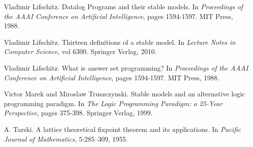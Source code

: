 \documentclass[11pt]{article}
\begin{document}
\begin{thebibliography}{16}
  Vladimir Lifschitz. 
  Datalog Programs and their stable models.
  In \textit{Proceedings of the AAAI Conference on Artificial Intelligence}, pages 1594-1597. 
  MIT Press, 1988.

  Vladimir Lifschitz. 
  Thirteen definitions of a stable model.  
  In \textit{Lecture Notes in Computer Science}, vol 6300. 
  Springer Verlag, 2010.

  Vladimir Lifschitz. 
  What is answer set programming? 
  In \textit{Proceedings of the AAAI Conference on Artificial Intelligence}, pages 1594-1597. 
  MIT Press, 1988.

  Victor Marek and Miroslaw Truszczynski. 
  Stable models and an alternative logic programming paradigm.  
  In \textit{The Logic Programming Paradigm: a 25-Year Perspective}, pages 375-398. 
  Springer Verlag, 1999.

  A. Tarski. 
  A lattice theoretical fixpoint theorem and its applications. 
  In \textit{Pacific Journal of Mathematics}, 5:285–309, 1955.
\end{thebibliography}
\end{document}
